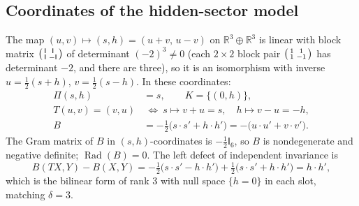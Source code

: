 \documentclass[11pt,a4paper]{article}
\newcommand{\RR}{\mathbb{R}}
\newcommand{\Rad}{\operatorname{Rad}}
\newcommand{\defic}{\delta}
\theoremstyle{plain}
\theoremstyle{definition}
\begin{document}
\subsection{Coordinates of the hidden-sector model}
The map $(u,v)\mapsto(s,h)=(u+v,\,u-v)$ on $\RR^3\oplus\RR^3$ is linear with block matrix $\begin{psmallmatrix}\mathsf I&\mathsf I\\ \mathsf I&-\mathsf I\end{psmallmatrix}$ of determinant $(-2)^3\neq0$ (each $2\times2$ block pair $\begin{psmallmatrix}1&1\\1&-1\end{psmallmatrix}$ has determinant $-2$, and there are three), so it is an isomorphism with inverse $u=\tfrac12(s+h)$, $v=\tfrac12(s-h)$. In these coordinates:
\begin{align*}
\Pi(s,h)&=s,\qquad K=\{(0,h)\},\\
T(u,v)=(v,u)&\ \Longleftrightarrow\ s\mapsto v+u=s,\quad h\mapsto v-u=-h,\\
B&=-\tfrac12\bigl(s\!\cdot s'+h\!\cdot h'\bigr)=-\bigl(u\!\cdot u'+v\!\cdot v'\bigr).
\end{align*}
The Gram matrix of $B$ in $(s,h)$-coordinates is $-\tfrac12\mathsf I_6$, so $B$ is nondegenerate and negative definite; $\Rad(B)=0$.
The left defect of independent invariance is
\[ B(TX,Y)-B(X,Y)=-\tfrac12\bigl(s\!\cdot s'-h\!\cdot h'\bigr)+\tfrac12\bigl(s\!\cdot s'+h\!\cdot h'\bigr)=h\!\cdot h', \]
which is the bilinear form of rank $3$ with null space $\{h=0\}$ in each slot, matching $\defic=3$.
\end{document}
